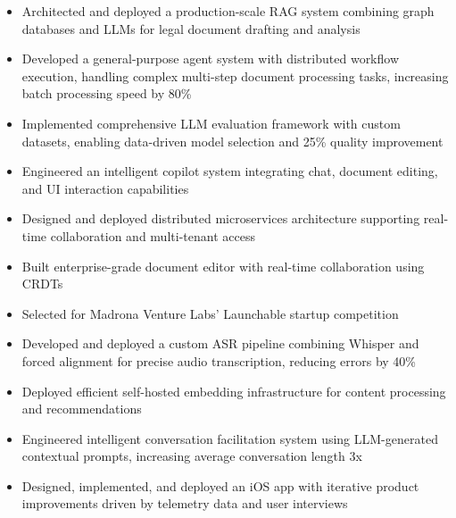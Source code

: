 \documentclass{my_cv}
\begin{document}
\begin{adjustwidth}{2em}{0em}


\begin{itemize}
\item Architected and deployed a production-scale RAG system combining graph databases and LLMs for legal document drafting and analysis
\item Developed a general-purpose agent system with distributed workflow execution, handling complex multi-step document processing tasks, increasing batch processing speed by 80\%
\item Implemented comprehensive LLM evaluation framework with custom datasets, enabling data-driven model selection and 25\% quality improvement
\item Engineered an intelligent copilot system integrating chat, document editing, and UI interaction capabilities
\item Designed and deployed distributed microservices architecture supporting real-time collaboration and multi-tenant access
\item Built enterprise-grade document editor with real-time collaboration using CRDTs
\item Selected for Madrona Venture Labs' Launchable startup competition

\end{itemize}
\vspace{0.5em}


\begin{itemize}
    \item Developed and deployed a custom ASR pipeline combining Whisper and forced alignment for precise audio transcription, reducing errors by 40\%
\item Deployed efficient self-hosted embedding infrastructure for content processing and recommendations
\item Engineered intelligent conversation facilitation system using LLM-generated contextual prompts, increasing average conversation length 3x
\item Designed, implemented, and deployed an iOS app with iterative product improvements driven by telemetry data and user interviews
\end{itemize}
\vspace{0.5em}


\end{adjustwidth}
\end{document}
